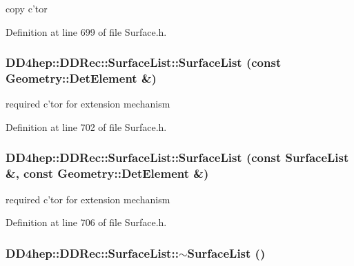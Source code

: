 copy c'tor 

Definition at line 699 of file Surface.h.\hypertarget{class_d_d4hep_1_1_d_d_rec_1_1_surface_list_af1e802fd9aee21769c7ff3a3ed7f2e65}{
\subsubsection[{SurfaceList}]{\setlength{\rightskip}{0pt plus 5cm}DD4hep::DDRec::SurfaceList::SurfaceList (const {\bf Geometry::DetElement} \&)}}
\label{class_d_d4hep_1_1_d_d_rec_1_1_surface_list_af1e802fd9aee21769c7ff3a3ed7f2e65}


required c'tor for extension mechanism 

Definition at line 702 of file Surface.h.\hypertarget{class_d_d4hep_1_1_d_d_rec_1_1_surface_list_a1655044af6ad83e5d51e8513718a8f34}{
\subsubsection[{SurfaceList}]{\setlength{\rightskip}{0pt plus 5cm}DD4hep::DDRec::SurfaceList::SurfaceList (const {\bf SurfaceList} \&, \/  const {\bf Geometry::DetElement} \&)}}
\label{class_d_d4hep_1_1_d_d_rec_1_1_surface_list_a1655044af6ad83e5d51e8513718a8f34}


required c'tor for extension mechanism 

Definition at line 706 of file Surface.h.\hypertarget{class_d_d4hep_1_1_d_d_rec_1_1_surface_list_a8ba1884b4e65fbd42703cb8059cb0fb2}{
\subsubsection[{$\sim$SurfaceList}]{\setlength{\rightskip}{0pt plus 5cm}DD4hep::DDRec::SurfaceList::$\sim$SurfaceList ()}}
\label{class_d_d4hep_1_1_d_d_rec_1_1_surface_list_a8ba1884b4e65fbd42703cb8059cb0fb2}



